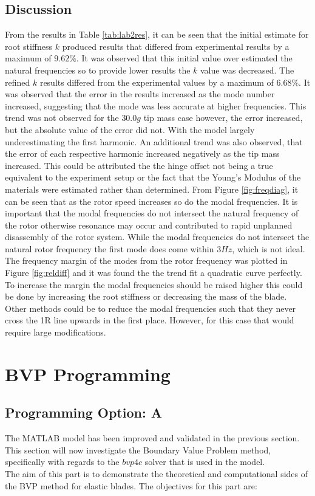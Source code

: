 \documentclass[11pt]{article}
\begin{document}
\subsection{Discussion}
From the results in Table \ref{tab:lab2res}, it can be seen that the initial estimate for root stiffness $k$ produced results that differed from experimental results by a maximum of $9.62\%$. It was observed that this initial value over estimated the natural frequencies so to provide lower results the $k$ value was decreased. The refined $k$ results differed from the experimental values by a maximum of $6.68\%$. It was observed that the error in the results increased as the mode number increased, suggesting that the mode was less accurate at higher frequencies. This trend was not observed for the $30.0g$ tip mass case however, the error increased, but the absolute value of the error did not. With the model largely underestimating the first harmonic. An additional trend was also observed, that the error of each respective harmonic increased negatively as the tip mass increased. This could be attributed the the hinge offset not being a true equivalent to the experiment setup or the fact that the Young's Modulus of the materials were estimated rather than determined.
From Figure \ref{fig:freqdiag}, it can be seen that as the rotor speed increases so do the modal frequencies. It is important that the modal frequencies do not intersect the natural frequency of the rotor otherwise resonance may occur and contributed to rapid unplanned disassembly of the rotor system. While the modal frequencies do not intersect the natural rotor frequency the first mode does come within $3Hz$, which is not ideal. The frequency margin of the modes from the rotor frequency was plotted in Figure \ref{fig:reldiff} and it was found the the trend fit a quadratic curve perfectly. To increase the margin the modal frequencies should be raised higher this could be done by increasing the root stiffness or decreasing the mass of the blade. Other methods could be to reduce the modal frequencies such that they never cross the 1R line upwards in the first place. However, for this case that would require large modifications.


\section{BVP Programming}
\subsection{Programming Option: A}
The MATLAB model has been improved and validated in the previous section. This section will now investigate the Boundary Value Problem method, specifically with regards to the $bvp4c$ solver that is used in the model.\\
The aim of this part is to demonstrate the theoretical and computational sides of the BVP method for elastic blades. The objectives for this part are:
\end{document}
